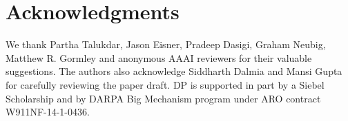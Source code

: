 \documentclass[letterpaper]{article} %
\begin{document}
\section{ Acknowledgments}
We thank Partha Talukdar, Jason Eisner, Pradeep Dasigi, Graham Neubig, Matthew R. Gormley and anonymous AAAI reviewers for their valuable suggestions. The authors also acknowledge Siddharth Dalmia and Mansi Gupta for carefully reviewing the paper draft. DP is supported in part by a Siebel Scholarship and by DARPA Big Mechanism program under ARO contract W911NF-14-1-0436. 



\end{document}
